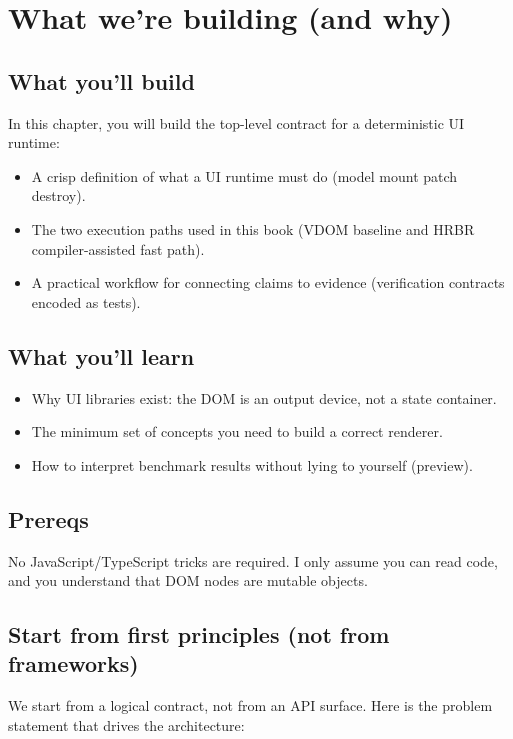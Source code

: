 \chapter{What we're building (and why)}
\label{ch:what-and-why}

\section{What you'll build}
In this chapter, you will build the top-level contract for a deterministic UI runtime:

\begin{itemize}
  \item A crisp definition of what a UI runtime must do (model \textrightarrow mount \textrightarrow patch \textrightarrow destroy).
  \item The two execution paths used in this book (VDOM baseline and HRBR compiler-assisted fast path).
  \item A practical workflow for connecting claims to evidence (verification contracts encoded as tests).
\end{itemize}

\section{What you'll learn}
\begin{itemize}
  \item Why UI libraries exist: the DOM is an output device, not a state container.
  \item The minimum set of concepts you need to build a correct renderer.
  \item How to interpret benchmark results without lying to yourself (preview).
\end{itemize}

\section{Prereqs}
No JavaScript/TypeScript tricks are required.
I only assume you can read code, and you understand that DOM nodes are mutable objects.

\section{Start from first principles (not from frameworks)}
We start from a logical contract, not from an API surface.
Here is the problem statement that drives the architecture:

